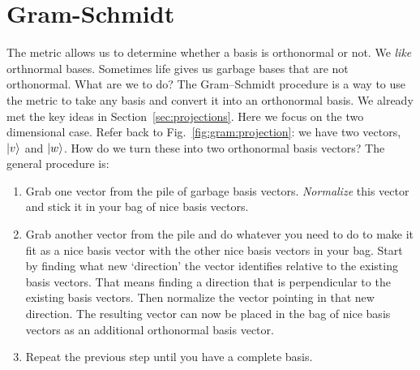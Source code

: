 \documentclass[12pt, oneside]{report}    %
\let\oldsection\section
\def\section{%
  \setcounter{sidenote}{1}%
  \oldsection
}
\begin{document}


\section{Gram-Schmidt}

The metric allows us to determine whether a basis is orthonormal or not. We \emph{like} orthnormal bases. Sometimes life gives us garbage bases that are not orthonormal. What are we to do? The Gram--Schmidt procedure is a way to use the metric to take any basis and convert it into an orthonormal basis. We already met the key ideas in Section~\ref{sec:projections}. Here we focus on the two dimensional case. Refer back to Fig.~\ref{fig:gram:projection}: we have two vectors, $\left|v\right\rangle$ and $\left|w\right\rangle$. How do we turn these into two orthonormal basis vectors?
%
The general procedure is:
\begin{enumerate}
    \item Grab one vector from the pile of garbage basis vectors. \emph{Normalize} this vector and stick it in your bag of nice basis vectors. 
    \item Grab another vector from the pile and do whatever you need to do to make it fit as a nice basis vector with the other nice basis vectors in your bag. Start by finding what new `direction' the vector identifies relative to the existing basis vectors. That means finding a direction that is perpendicular to the existing basis vectors. Then normalize the vector pointing in that new direction. The resulting vector can now be placed in the bag of nice basis vectors as an additional orthonormal basis vector.
    \item Repeat the previous step until you have a complete basis. 
\end{enumerate}
\end{document}

